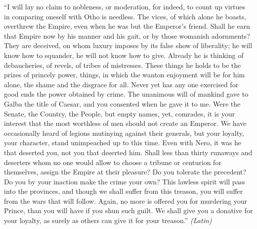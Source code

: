 ``I will lay no claim to nobleness, or moderation, for indeed, to count up virtues in comparing oneself with Otho is needless. The vices, of which alone he boasts, overthrew the Empire, even when he was but the Emperor's friend. Shall he earn that Empire now by his manner and his gait, or by those womanish adornments? They are deceived, on whom luxury imposes by its false show of liberality; he will know how to squander, he will not know how to give. Already he is thinking of debaucheries, of revels, of tribes of mistresses. These things he holds to be the prizes of princely power, things, in which the wanton enjoyment will be for him alone, the shame and the disgrace for all. Never yet has any one exercised for good ends the power obtained by crime. The unanimous will of mankind gave to Galba the title of Caesar, and you consented when he gave it to me. Were the Senate, the Country, the People, but empty names, yet, comrades, it is your interest that the most worthless of men should not create an Emperor. We have occasionally heard of legions mutinying against their generals, but your loyalty, your character, stand unimpeached up to this time. Even with Nero, it was he that deserted you, not you that deserted him. Shall less than thirty runaways and deserters whom no one would allow to choose a tribune or centurion for themselves, assign the Empire at their pleasure? Do you tolerate the precedent? Do you by your inaction make the crime your own? This lawless spirit will pass into the provinces, and though we shall suffer from this treason, you will suffer from the wars that will follow. Again, no more is offered you for murdering your Prince, than you will have if you shun such guilt. We shall give you a donative for your loyalty, as surely as others can give it for your treason.'' \emph{(Latin)}


